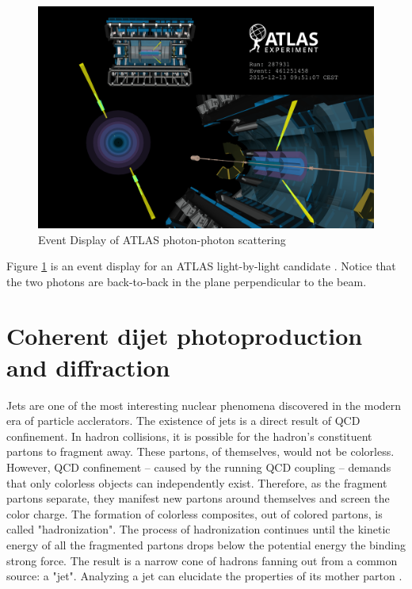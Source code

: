 \begin{figure}[]
\begin{centering}
\includegraphics[width=5in]{Chapter2/importfigs/light-by-light-figure_2.png}
\par\end{centering}
\caption{Event Display of ATLAS photon-photon scattering \cite{Collaboration:2278547} \label{fig:atlasEvent}}
\end{figure}

Figure \ref{fig:atlasEvent} is an event display for an ATLAS light-by-light candidate \cite{Collaboration:2278547}. Notice that the two photons are back-to-back in the plane perpendicular to the beam.

\section{Coherent dijet photoproduction and diffraction}

Jets are one of the most interesting nuclear phenomena discovered in the modern era of particle acclerators. The existence of jets is a direct result of QCD confinement. In hadron collisions, it is possible for the hadron's constituent partons to fragment away. These partons, of themselves, would not be colorless. However, QCD confinement -- caused by the running QCD coupling -- demands that only colorless objects can independently exist. Therefore, as the fragment partons separate, they manifest new partons around themselves and screen the color charge. The formation of colorless composites, out of colored partons, is called "hadronization". The process of hadronization continues until the kinetic energy of all the fragmented partons drops below the potential energy the binding strong force. The result is a narrow cone of hadrons fanning out from a common source: a "jet". Analyzing a jet can elucidate the properties of its mother parton \cite{d'Enterria:2004nv}.  

